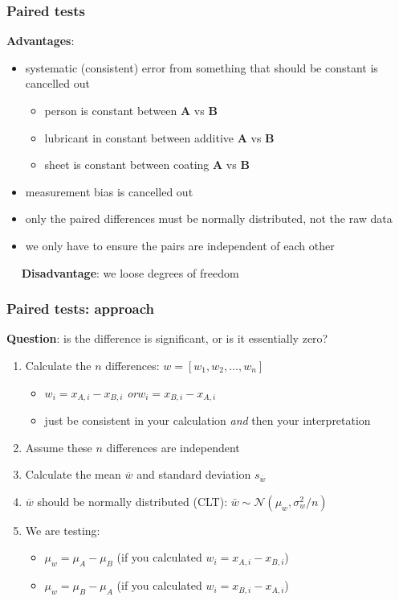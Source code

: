 \begin{frame}\frametitle{Paired tests}

	\textbf{Advantages}:
	\begin{itemize}
		\item	systematic (consistent) error from something that should be constant is cancelled out
		\begin{itemize}
			\item	person is constant between \textbf{A} vs \textbf{B}
			\item	lubricant in constant between additive \textbf{A} vs \textbf{B}
			\item	sheet is constant between coating \textbf{A} vs \textbf{B}
		\end{itemize}
		\item	measurement bias is cancelled out
		\item	only the paired differences must be normally distributed, not the raw data
		\item	we only have to ensure the pairs are independent of each other
	\end{itemize}

	$\quad$ \textbf{Disadvantage}: we loose degrees of freedom
\end{frame}

\begin{frame}\frametitle{Paired tests: approach}

	\textbf{Question}: is the difference is significant, or is it essentially zero?
	\begin{enumerate}
		\item	Calculate the $n$ differences: $w = [w_1, w_2, \ldots, w_n]$
		\begin{itemize}
			\item	$w_i = x_{A,i} - x_{B,i}$  \qquad\emph{or}\qquad $w_i = x_{B,i} - x_{A,i}$
			\item	just be consistent in your calculation \emph{and} then your interpretation
		\end{itemize}
		\item	Assume these $n$ differences are independent
		\item	Calculate the mean $\overline{w}$ and standard deviation $s_{\overline{w}}$
		\item	$\overline{w}$ should be normally distributed (CLT): $\bar{w} \sim \mathcal{N}\left(\mu_w, \sigma_w^2/n \right)$
		\item	We are testing: 
		\begin{itemize}
			\item	$\mu_w = \mu_A - \mu_B$  (if you calculated $w_i = x_{A,i} - x_{B,i}$)
			\item	$\mu_w = \mu_B - \mu_A$  (if you calculated $w_i = x_{B,i} - x_{A,i}$)
		\end{itemize}
	\end{enumerate}
\end{frame}

